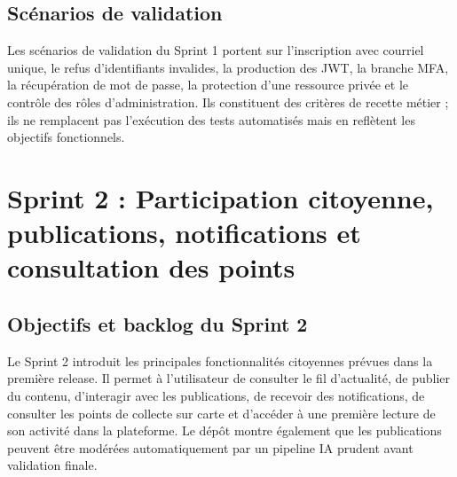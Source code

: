 \label{fig:r1_s1_class}

\subsection{Scénarios de validation}

Les scénarios de validation du Sprint 1 portent sur l'inscription avec courriel unique, le refus d'identifiants invalides, la production des JWT, la branche MFA, la récupération de mot de passe, la protection d'une ressource privée et le contrôle des rôles d'administration. Ils constituent des critères de recette métier ; ils ne remplacent pas l'exécution des tests automatisés mais en reflètent les objectifs fonctionnels.

\section{Sprint 2 : Participation citoyenne, publications, notifications et consultation des points}
\label{sec:r1_sprint2}

\subsection{Objectifs et backlog du Sprint 2}

Le Sprint 2 introduit les principales fonctionnalités citoyennes prévues dans la première release. Il permet à l'utilisateur de consulter le fil d'actualité, de publier du contenu, d'interagir avec les publications, de recevoir des notifications, de consulter les points de collecte sur carte et d'accéder à une première lecture de son activité dans la plateforme. Le dépôt montre également que les publications peuvent être modérées automatiquement par un pipeline IA prudent avant validation finale.

